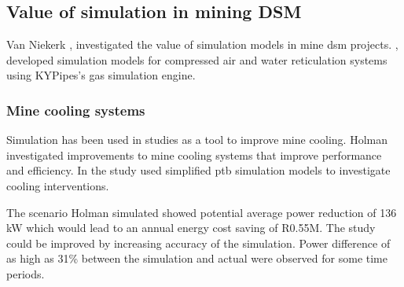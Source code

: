 		\begin{figure}[h!]
			\centering
			\fbox{\hspace{2cm}\hspace{2cm}}
			\caption{ }
			\label{fig: 3D Benchmark}
		\end{figure}
	\subsection{Value of simulation in mining DSM}
	Van Niekerk \cite{van2013value},\cite{vanNiekerk2012Value} investigated the value of simulation models in mine \gls{dsm} projects. \cite{van2013value},\cite{vanNiekerk2012Value} developed simulation models for compressed air and water reticulation systems using KYPipes's gas simulation engine. \\
	
	\subsubsection{Mine cooling systems}
	Simulation has been used in studies as a tool to improve mine cooling. Holman \cite{Holman2014Masters} investigated improvements to mine cooling systems that improve performance and efficiency. In the study \cite{Holman2014Masters} used simplified \gls{ptb}  simulation models to investigate cooling interventions.
	\par 
	The scenario Holman simulated showed potential  average power reduction of 136 kW  which would lead to an annual energy cost saving of R0.55M. The study could be improved by increasing accuracy of the simulation. Power difference of as high as 31\% between the simulation and actual were observed for some time periods.
	
		
